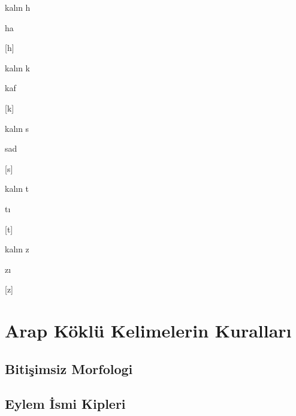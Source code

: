 \documentclass[a5paper,12pt]{scrbook}
\newlength{\linew}
\newlength{\rowh}
\newcommand{\mprow}[5]{%
  \noindent
  \begin{minipage}[b][\rowh]{\linewidth}%
  \begin{minipage}{0.15\linew}%
    \Large #2
  \end{minipage}
  \begin{minipage}{0.15\linewidth}
    \large #1
  \end{minipage}
  \begin{minipage}{0.20\linew}%
    #3
  \end{minipage}
  \begin{minipage}{0.20\linew}
    #4
  \end{minipage}
  \begin{minipage}{0.20\linew}
    #5
  \end{minipage}
  \end{minipage}%
  \newline\noindent %
}
\begin{document}
\mprow{\arha     }{\kH\kh }{kalın h      }{ha             }{[h]            }
\mprow{\arkaf    }{\kK\kk }{kalın k      }{kaf            }{[k]            }
\mprow{\arsad    }{\kS\ks }{kalın s      }{sad            }{[s]            }
\mprow{\arta     }{\kT\kt }{kalın t      }{tı             }{[t]            }
\mprow{\arza     }{\kZ\kz }{kalın z      }{zı             }{[z]            }



\chapter{Arap Köklü Kelimelerin Kuralları}
\section{Bitişimsiz Morfologi}

\section{Eylem İsmi Kipleri}
\end{document}
